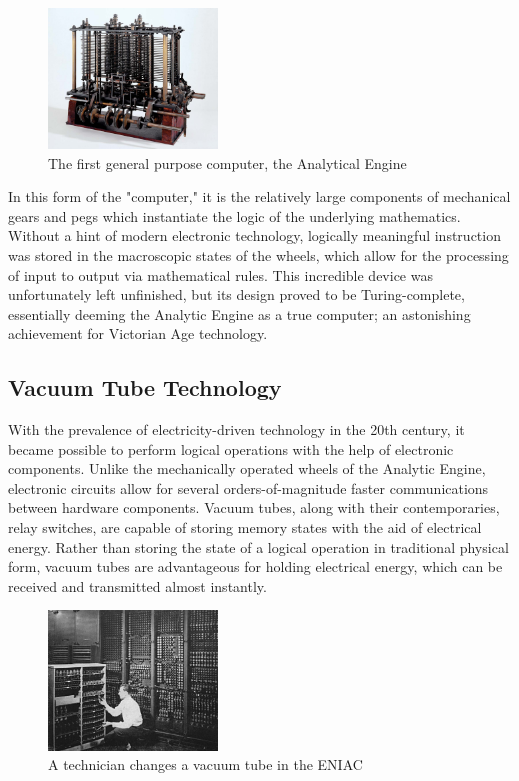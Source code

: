 \documentclass[letterpaper, 10 pt, conference]{IEEEconf}
\begin{document}
\begin{figure}[h!]
\centering
\captionsetup{justification=centering}
\includegraphics[width=0.4\textwidth]{portion-Charles-Babbage-Analytical-Engine-death-mill-1871.jpg}
\caption{The first general purpose computer, the Analytical Engine}
\label{fig:example}
\end{figure} 

In this form of the "computer," it is the relatively large components of mechanical gears and pegs which instantiate the logic of the underlying mathematics. Without a hint of modern electronic technology, logically meaningful instruction was stored in the macroscopic states of the wheels, which allow for the processing of input to output via mathematical rules. This incredible device was unfortunately left unfinished, but its design proved to be Turing-complete, essentially deeming the Analytic Engine as a true computer; an astonishing achievement for Victorian Age technology. 

\subsection{Vacuum Tube Technology}
With the prevalence of electricity-driven technology in the 20th century, it became possible to perform logical operations with the help of electronic components. Unlike the mechanically operated wheels of the Analytic Engine, electronic circuits allow for several orders-of-magnitude faster communications between hardware components. Vacuum tubes, along with their contemporaries, relay switches, are capable of storing memory states with the aid of electrical energy. Rather than storing the state of a logical operation in traditional physical form, vacuum tubes are advantageous for holding electrical energy, which can be received and transmitted almost instantly. 


\begin{figure}[h!]
\centering
\captionsetup{justification=centering}
\includegraphics[width=0.4\textwidth]{ENIAC-changing_a_tube.jpg}
\caption{A technician changes a vacuum tube in the ENIAC}
\label{fig:example}
\end{figure}
\end{document}
